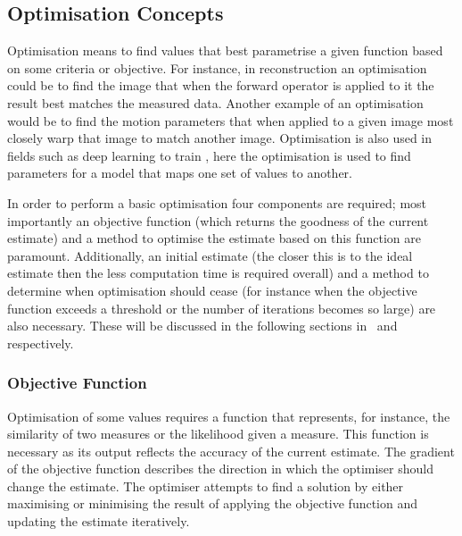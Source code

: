         \subsection{Optimisation Concepts} \label{sec:optimisation_concepts}
            Optimisation means to find values that best parametrise a given function based on some criteria or objective. %
            For instance, in reconstruction an optimisation could be to find the image that when the forward operator is applied to it the result best matches the measured data. Another example of an optimisation would be to find the motion parameters that when applied to a given image most closely warp that image to match another image. Optimisation is also used in fields such as deep learning to train , here the optimisation is used to find parameters for a model that maps one set of values to another.%
            
            \newpage
            
            In order to perform a basic optimisation four components are required; most importantly an objective function (which returns the goodness of the current estimate) and a method to optimise the estimate based on this function are paramount. Additionally, an initial estimate (the closer this is to the ideal estimate then the less computation time is required overall) and a method to determine when optimisation should cease (for instance when the objective function exceeds a threshold or the number of iterations becomes so large) are also necessary. These will be discussed in the following sections in~ and~ respectively.
        
            \subsubsection{Objective Function} \label{sec:objective_function}
                Optimisation of some values requires a function that represents, for instance, the similarity of two measures or the likelihood given a measure. This function is necessary as its output reflects the accuracy of the current estimate. The gradient of the objective function describes the direction in which the optimiser should change the estimate. The optimiser attempts to find a solution by either maximising or minimising the result of applying the objective function and updating the estimate iteratively.
                
